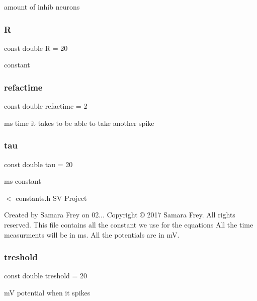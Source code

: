 amount of inhib neurons 

\mbox{\label{constants_8h_a0877420f3d7b1f47b871d2ccb47168d8}} 
\subsubsection{R}
{\footnotesize\ttfamily const double R = 20}



constant 

\mbox{\label{constants_8h_af4833bd02aabd3f9bd897677d3a4acb1}} 
\subsubsection{refactime}
{\footnotesize\ttfamily const double refactime = 2}



ms time it takes to be able to take another spike 

\mbox{\label{constants_8h_a9a42c4d90eb9808c60bb3f1be6a0c1a7}} 
\subsubsection{tau}
{\footnotesize\ttfamily const double tau = 20}



ms constant 

$<$ constants.\+h SV Project

Created by Samara Frey on 02... Copyright © 2017 Samara Frey. All rights reserved. This file contains all the constant we use for the equations All the time measurments will be in ms. All the potentials are in mV. \mbox{\label{constants_8h_a82a0ca3ab70a0a31c932651ac335723a}} 
\subsubsection{treshold}
{\footnotesize\ttfamily const double treshold = 20}



mV potential when it spikes 

